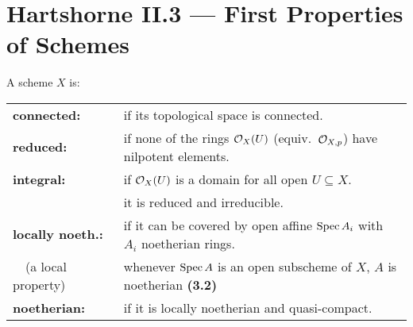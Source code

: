 \documentclass[11pt]{article}
\newcommand{\Index}[1]{\index{#1}#1}
\newcommand{\indexThm}[1]{\index{Hartshorne!Theorems, etc.!#1}}
\newcommand{\Entry}[3][notcustom]{\Bullet
\ifthenelse{\equal{#1}{}}{}
{
\ifthenelse{\equal{#1}{notcustom}}{\index{#2}}{\index{#1}}
}
 \textbf{#2:}&#3}
\begin{document}
\section*{Hartshorne II.3 --- First Properties of Schemes}
\begin{itemise}
\item A scheme $X$ is:\\
\begin{tabular}{p{}p{}}
\Entry{connected}{if its topological space is connected.}\\
\Entry{reduced}{if none of the rings $\mathcal{O}_X(U)$ (equiv.\ $\mathcal{O}_{X,p}$) have
nilpotent elements.}\\
\Entry{integral}{if $\mathcal{O}_X(U)$ is a domain for all open $U\subseteq X$.\\&
\Iff it is reduced and irreducible.}\\
\Entry[locally noetherian]{locally noeth.}{if it can be covered by open affine
$\operatorname{Spec} A_i$ with $A_i$ noetherian rings.\\{\ \ \small(a local property)}&
\Iff whenever $\operatorname{Spec} A$ is an open subscheme of $X$, $A$ is
noetherian\indexThm{II.3.2} \textbf{(3.2)}}\\
\Entry{noetherian}{if it is locally noetherian and quasi-compact.}
\end{tabular}
%
%

\end{itemise}
\end{document}
